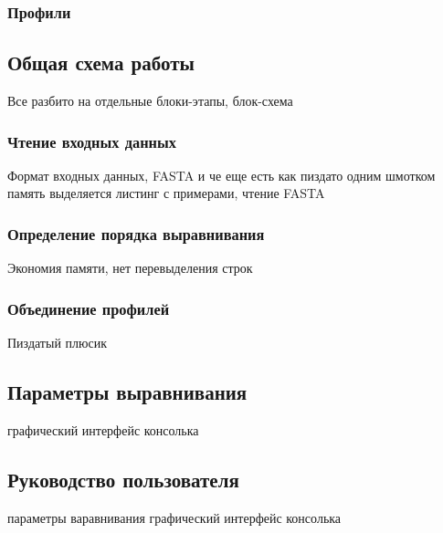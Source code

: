 \subsubsection[Профили]{\large Профили}
\hspace{\parindent} 

\subsection[Общая схема работы]{\large Общая схема работы}
\hspace{\parindent} Все разбито на отдельные блоки-этапы, блок-схема

\subsubsection[Чтение входных данных]{\large Чтение входных данных}
\hspace{\parindent} Формат входных данных, FASTA и че еще есть
как пиздато одним шмотком память выделяется
листинг с примерами, чтение FASTA

\subsubsection[Определение порядка выравнивания]{\large Определение порядка выравнивания}
\hspace{\parindent} Экономия памяти, нет перевыделения строк

\subsubsection[Объединение профилей]{\large Объединение профилей}
\hspace{\parindent} Пиздатый плюсик

\subsection[Параметры выравнивания]{\large Параметры выравнивания}
\hspace{\parindent} графический интерфейс консолька

\subsection[Руководство пользователя]{\large Руководство пользователя}
\hspace{\parindent} параметры варавнивания графический интерфейс консолька